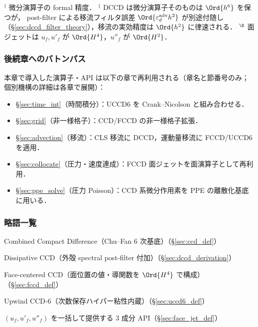 \noindent
{\footnotesize
$^\dagger$ 微分演算子の formal 精度．
$^\ddagger$ DCCD は微分演算子そのものは $\Ord{h^6}$ を保つが，
post-filter による移流フィルタ誤差 $\Ord{\varepsilon_d^{\mathrm{adv}} h^2}$ が別途付随し
（§\ref{sec:dccd_filter_theory}），移流の実効精度は $\Ord{h^2}$ に律速される．
$^\S$ 面ジェットは $u_f, u'_f$ が $\Ord{H^4}$，$u''_f$ が $\Ord{H^2}$．
}

\subsubsection*{後続章へのバトンパス}

本章で導入した演算子・API は以下の章で再利用される（章名と節番号のみ；
個別機構の詳細は各章で展開）：

\begin{itemize}\setlength{\itemsep}{0pt}
  \item \S\ref{sec:time_int}（時間積分）：UCCD6 を Crank--Nicolson と組み合わせる．
  \item \S\ref{sec:grid}（非一様格子）：CCD/FCCD の非一様格子拡張．
  \item \S\ref{sec:advection}（移流）：CLS 移流に DCCD，運動量移流に FCCD/UCCD6 を適用．
  \item \S\ref{sec:collocate}（圧力・速度連成）：FCCD 面ジェットを面演算子として再利用．
  \item \S\ref{sec:ppe_solve}（圧力 Poisson）：CCD 系微分作用素を PPE の離散化基底に用いる．
\end{itemize}

\subsubsection*{略語一覧}

\begin{description}\setlength{\itemsep}{0pt}
  \item[CCD] Combined Compact Difference（Chu--Fan 6 次基底）（§\ref{sec:ccd_def}）
  \item[DCCD] Dissipative CCD（外殻 spectral post-filter 付加）（§\ref{sec:dccd_derivation}）
  \item[FCCD] Face-centered CCD（面位置の値・導関数を $\Ord{H^4}$ で構成）（§\ref{sec:fccd_def}）
  \item[UCCD6] Upwind CCD-6（次数保存ハイパー粘性内蔵）（§\ref{sec:uccd6_def}）
  \item[面ジェット $\FaceJet{u}$] $(u_f, u'_f, u''_f)$ を一括して提供する 3 成分 API（§\ref{sec:face_jet_def}）
\end{description}

